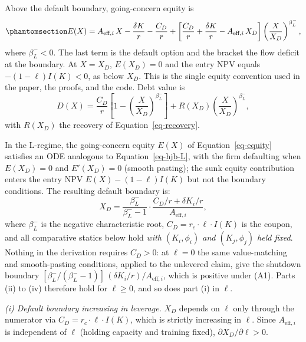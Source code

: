 \documentclass[
  11pt,
  letterpaper,
]{scrartcl}
\begin{document}
Above the default boundary, going-concern equity is
\begin{equation}\protect\phantomsection\label{eq-equity}{
E(X) = A_{\text{eff},i}\, X - \frac{\delta K}{r} - \frac{C_D}{r} + \left[\frac{C_D}{r} + \frac{\delta K}{r} - A_{\text{eff},i}\, X_D \right]\left(\frac{X}{X_D}\right)^{\beta_L^-},
}\end{equation} where \(\beta_L^- < 0\). The last term is the default
option and the bracket the flow deficit at the boundary. At \(X = X_D\),
\(E(X_D) = 0\) and the entry NPV equals \(-(1-\ell)I(K) < 0\), as below
\(X_D\). This is the single equity convention used in the paper, the
proofs, and the code. Debt value is \[
D(X) = \frac{C_D}{r}\left[1 - \left(\frac{X}{X_D}\right)^{\beta_L^-}\right] + R(X_D) \left(\frac{X}{X_D}\right)^{\beta_L^-},
\] with \(R(X_D)\) the recovery of Equation~\ref{eq-recovery}.

In the L-regime, the going-concern equity \(E(X)\) of
Equation~\ref{eq-equity} satisfies an ODE analogous to
Equation~\ref{eq-hjb-L}, with the firm defaulting when \(E(X_D) = 0\)
and \(E'(X_D) = 0\) (smooth pasting); the sunk equity contribution
enters the entry NPV \(E(X) - (1-\ell)I(K)\) but not the boundary
conditions. The resulting default boundary is: \[
X_D = \frac{\beta_L^-}{\beta_L^- - 1} \cdot \frac{C_D/r + \delta K_i/r}{A_{\text{eff},i}},
\] where \(\beta_L^-\) is the negative characteristic root,
\(C_D = r_c \cdot \ell \cdot I(K)\) is the coupon, and all comparative
statics below hold \emph{with \((K_i, \phi_i)\) and \((K_j, \phi_j)\)
held fixed}. Nothing in the derivation requires \(C_D > 0\): at
\(\ell = 0\) the same value-matching and smooth-pasting conditions,
applied to the unlevered claim, give the shutdown boundary
\([\beta_L^-/(\beta_L^- - 1)]\,(\delta K_i/r)/A_{\text{eff},i}\), which
is positive under (A1). Parts (ii) to (iv) therefore hold for
\(\ell \geq 0\), and so does part (i) in \(\ell\).

\emph{(i) Default boundary increasing in leverage.} \(X_D\) depends on
\(\ell\) only through the numerator via
\(C_D = r_c \cdot \ell \cdot I(K)\), which is strictly increasing in
\(\ell\). Since \(A_{\text{eff},i}\) is independent of \(\ell\) (holding
capacity and training fixed), \(\partial X_D / \partial \ell > 0\).
\end{document}
